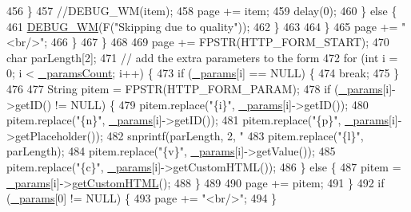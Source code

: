 \begin{DoxyCode}
456           \}
457           \textcolor{comment}{//DEBUG\_WM(item);}
458           page += item;
459           delay(0);
460         \} \textcolor{keywordflow}{else} \{
461           \hyperlink{class_wi_fi_manager_ae5f595c670ccbcf9a191baf50f5c7c26}{DEBUG\_WM}(F(\textcolor{stringliteral}{"Skipping due to quality"}));
462         \}
463 
464       \}
465       page += \textcolor{stringliteral}{"<br/>"};
466     \}
467   \}
468 
469   page += FPSTR(HTTP\_FORM\_START);
470   \textcolor{keywordtype}{char} parLength[2];
471   \textcolor{comment}{// add the extra parameters to the form}
472   \textcolor{keywordflow}{for} (\textcolor{keywordtype}{int} i = 0; i < \hyperlink{class_wi_fi_manager_a22e803d23ae77cb611914445db17c9b6}{\_paramsCount}; i++) \{
473     \textcolor{keywordflow}{if} (\hyperlink{class_wi_fi_manager_a355ce9bbaab94baffd1c83de9b166fea}{\_params}[i] == NULL) \{
474       \textcolor{keywordflow}{break};
475     \}
476 
477     String pitem = FPSTR(HTTP\_FORM\_PARAM);
478     \textcolor{keywordflow}{if} (\hyperlink{class_wi_fi_manager_a355ce9bbaab94baffd1c83de9b166fea}{\_params}[i]->getID() != NULL) \{
479       pitem.replace(\textcolor{stringliteral}{"\{i\}"}, \hyperlink{class_wi_fi_manager_a355ce9bbaab94baffd1c83de9b166fea}{\_params}[i]->getID());
480       pitem.replace(\textcolor{stringliteral}{"\{n\}"}, \hyperlink{class_wi_fi_manager_a355ce9bbaab94baffd1c83de9b166fea}{\_params}[i]->getID());
481       pitem.replace(\textcolor{stringliteral}{"\{p\}"}, \hyperlink{class_wi_fi_manager_a355ce9bbaab94baffd1c83de9b166fea}{\_params}[i]->getPlaceholder());
482       snprintf(parLength, 2, \textcolor{stringliteral}{"%
483       pitem.replace(\textcolor{stringliteral}{"\{l\}"}, parLength);
484       pitem.replace(\textcolor{stringliteral}{"\{v\}"}, \hyperlink{class_wi_fi_manager_a355ce9bbaab94baffd1c83de9b166fea}{\_params}[i]->getValue());
485       pitem.replace(\textcolor{stringliteral}{"\{c\}"}, \hyperlink{class_wi_fi_manager_a355ce9bbaab94baffd1c83de9b166fea}{\_params}[i]->getCustomHTML());
486     \} \textcolor{keywordflow}{else} \{
487       pitem = \hyperlink{class_wi_fi_manager_a355ce9bbaab94baffd1c83de9b166fea}{\_params}[i]->\hyperlink{class_wi_fi_manager_parameter_a596273c189eb40107500cee3ad31b13b}{getCustomHTML}();
488     \}
489 
490     page += pitem;
491   \}
492   \textcolor{keywordflow}{if} (\hyperlink{class_wi_fi_manager_a355ce9bbaab94baffd1c83de9b166fea}{\_params}[0] != NULL) \{
493     page += \textcolor{stringliteral}{"<br/>"};
494   \}
}
\end{DoxyCode}
